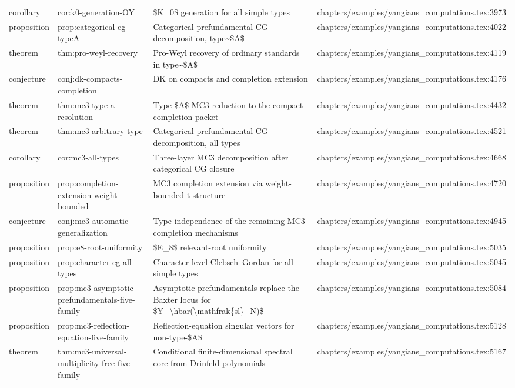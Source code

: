 \documentclass[11pt]{article}
\begin{document}
\begin{longtable}{L{0.10\textwidth}L{0.26\textwidth}L{0.42\textwidth}L{0.22\textwidth}}
corollary & cor:k0-generation-OY & \$K\_0\$ generation for all simple types & chapters/examples/yangians\_computations.tex:3973\\
proposition & prop:categorical-cg-typeA & Categorical prefundamental CG decomposition, type\textasciitilde{}\$A\$ & chapters/examples/yangians\_computations.tex:4022\\
theorem & thm:pro-weyl-recovery & Pro-Weyl recovery of ordinary standards in type\textasciitilde{}\$A\$ & chapters/examples/yangians\_computations.tex:4119\\
conjecture & conj:dk-compacts-completion & DK on compacts and completion extension & chapters/examples/yangians\_computations.tex:4176\\
theorem & thm:mc3-type-a-resolution & Type-\$A\$ MC3 reduction to the compact-completion packet & chapters/examples/yangians\_computations.tex:4432\\
theorem & thm:mc3-arbitrary-type & Categorical prefundamental CG decomposition, all types & chapters/examples/yangians\_computations.tex:4521\\
corollary & cor:mc3-all-types & Three-layer MC3 decomposition after categorical CG closure & chapters/examples/yangians\_computations.tex:4668\\
proposition & prop:completion-extension-weight-bounded & MC3 completion extension via weight-bounded t-structure & chapters/examples/yangians\_computations.tex:4720\\
conjecture & conj:mc3-automatic-generalization & Type-independence of the remaining MC3 completion mechanisms & chapters/examples/yangians\_computations.tex:4945\\
proposition & prop:e8-root-uniformity & \$E\_8\$ relevant-root uniformity & chapters/examples/yangians\_computations.tex:5035\\
proposition & prop:character-cg-all-types & Character-level Clebsch--Gordan for all simple types & chapters/examples/yangians\_computations.tex:5045\\
proposition & prop:mc3-asymptotic-prefundamentals-five-family & Asymptotic prefundamentals replace the Baxter locus for \$Y\_\textbackslash{}hbar(\textbackslash{}mathfrak\{sl\}\_N)\$ & chapters/examples/yangians\_computations.tex:5084\\
proposition & prop:mc3-reflection-equation-five-family & Reflection-equation singular vectors for non-type-\$A\$ & chapters/examples/yangians\_computations.tex:5128\\
theorem & thm:mc3-universal-multiplicity-free-five-family & Cond{}itional finite-dimensional spectral core from Drinfeld polynomials & chapters/examples/yangians\_computations.tex:5167\\

\end{longtable}
\end{document}
